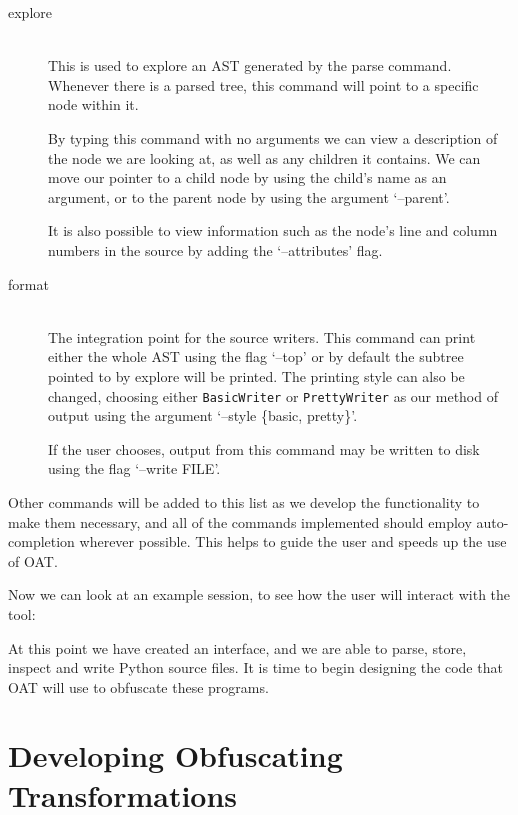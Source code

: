 \documentclass[twoside,a4paper]{report}
\begin{document}
\begin{description}
\item[explore] \hfill \\
This is used to explore an AST generated by the parse command. Whenever there is a parsed tree, this command will point to a specific node within it.

By typing this command with no arguments we can view a description of the node we are looking at, as well as any children it contains. We can move
our pointer to a child node by using the child's name as an argument, or to the parent node by using the argument `--parent'.

It is also possible to view information such as the node's line and column numbers in the source by adding the `--attributes' flag.

\item[format] \hfill \\
The integration point for the source writers. This command can print either the whole AST using the flag `--top' or by default the subtree pointed
to by explore will be printed. The printing style can also be changed, choosing either \texttt{BasicWriter} or \texttt{PrettyWriter} as our method
of output using the argument `--style \{basic, pretty\}'.

If the user chooses, output from this command may be written to disk using the flag `--write FILE'.
\end{description}

Other commands will be added to this list as we develop the functionality to make them necessary, and all of the commands implemented
should employ auto-completion wherever possible. This helps to guide the user and speeds up the use of OAT.

Now we can look at an example session, to see how the user will interact with the tool:


\pagebreak


At this point we have created an interface, and we are able to parse, store, inspect and write Python source
files. It is time to begin designing the code that OAT will use to obfuscate these programs.

\section{Developing Obfuscating Transformations}
\end{document}
